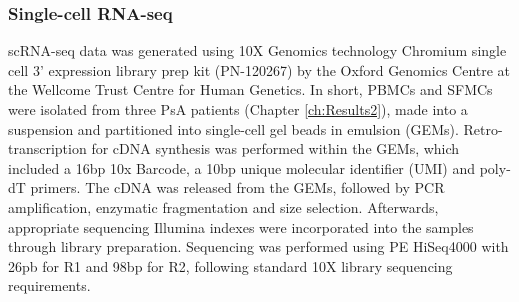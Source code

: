 \subsubsection{Single-cell RNA-seq} 
\label{scRNA_processing}
scRNA-seq data was generated using 10X Genomics technology Chromium single cell 3' expression library prep kit (PN-120267) by the Oxford Genomics Centre at the Wellcome Trust Centre for Human Genetics. In short, PBMCs and SFMCs were isolated from three PsA patients (Chapter \ref{ch:Results2}), made into a suspension and partitioned into single-cell gel beads in emulsion (GEMs). Retro-transcription for cDNA synthesis was performed within the GEMs, which included a 16bp 10x Barcode, a 10bp unique molecular identifier (UMI) and poly-dT primers. The cDNA was released from the GEMs, followed by PCR amplification, enzymatic fragmentation and size selection. Afterwards, appropriate sequencing Illumina indexes were incorporated into the samples through library preparation. Sequencing was performed using PE HiSeq4000 with 26pb for R1 and 98bp for R2, following standard 10X library sequencing requirements.








